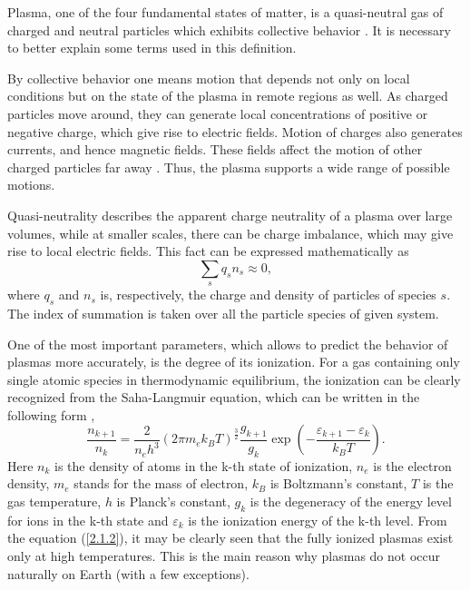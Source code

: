 Plasma, one of the four fundamental states of matter, is a quasi-neutral gas of charged and neutral particles which exhibits collective behavior \cite{Chen1984}. It is necessary to better explain some terms used in this definition.

By collective behavior one means motion that depends not only on local conditions but on the state of the plasma in remote regions as well. As charged particles move around, they can generate local concentrations of positive or negative charge, which give rise to electric fields. Motion of charges also generates currents, and hence magnetic fields. These fields affect the motion of other charged particles far away \cite{Chen1984}. Thus, the plasma supports a wide range of possible motions.

Quasi-neutrality describes the apparent charge neutrality of a plasma over large volumes, while at smaller scales, there can be charge imbalance, which may give rise to local electric fields. This fact can be expressed mathematically as
\begin{equation}
\label{2.1.1}
\sum_{s} q_s n_s \approx 0,
\end{equation}
where $ q_s $ and $ n_s $ is, respectively, the charge and density of particles of species $ s $. The index of summation is taken over all the particle species of given system.

One of the most important parameters, which allows to predict the behavior of plasmas more accurately, is the degree of its ionization. For a gas containing only single atomic species in thermodynamic equilibrium, the ionization can be clearly recognized from the Saha-Langmuir equation, which can be written in the following form \cite{Saha1920, Saha1921, Langmuir1923, Fridman2008},
\begin{equation}
\label{2.1.2}
\frac{n_{k+1}}{n_k} = \frac{2}{n_e h^3}\left(2\pi m_e k_B T\right)^{\frac{3}{2}} \frac{g_{k+1}}{g_k} \exp\left(-\frac{\varepsilon_{k+1} - \varepsilon_{k}}{k_{B} T} \right).
\end{equation}
Here $ n_k $ is the density of atoms in the k-th state of ionization, $ n_e $ is the electron density, $ m_e $ stands for the mass of electron, $ k_B $ is Boltzmann's constant, $ T $ is the gas temperature, $ h $ is Planck's constant, $ g_k $ is the degeneracy of the energy level for ions in the k-th state and $ \varepsilon_k $ is the ionization energy of the k-th level. From the equation (\ref{2.1.2}), it may be clearly seen that the fully ionized plasmas exist only at high temperatures. This is the main reason why plasmas do not occur naturally on Earth (with a few exceptions).

